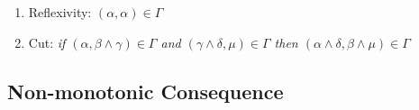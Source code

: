 %
\begin{enumerate}
    \item Reflexivity: $(\alpha, \alpha) \in \Gamma$
    \item Cut: \textit{if $(\alpha, \beta \land \gamma) \in \Gamma$ and $(\gamma \land \delta, \mu)\in \Gamma$ then $(\alpha \land \delta, \beta \land \mu)\in \Gamma$}
\end{enumerate}
\subsection{Non-monotonic Consequence}
\label{subsection: non-monotonic consequence}